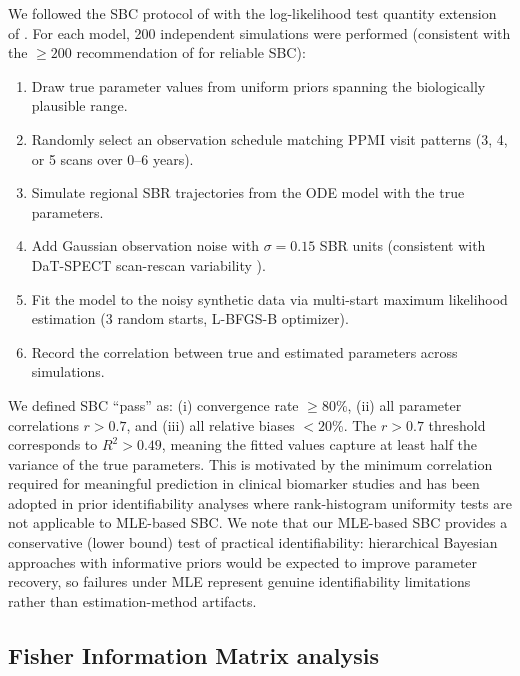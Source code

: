 We followed the SBC protocol of \cite{talts2018} with the log-likelihood test quantity extension of \cite{modrak2022}. For each model, 200 independent simulations were performed (consistent with the $\geq 200$ recommendation of \cite{talts2018} for reliable SBC):

\begin{enumerate}
\item Draw true parameter values from uniform priors spanning the biologically plausible range.
\item Randomly select an observation schedule matching PPMI visit patterns (3, 4, or 5 scans over 0--6 years).
\item Simulate regional SBR trajectories from the ODE model with the true parameters.
\item Add Gaussian observation noise with $\sigma = 0.15$ SBR units (consistent with DaT-SPECT scan-rescan variability \cite{tossicibolt2017}).
\item Fit the model to the noisy synthetic data via multi-start maximum likelihood estimation (3 random starts, L-BFGS-B optimizer).
\item Record the correlation between true and estimated parameters across simulations.
\end{enumerate}

We defined SBC ``pass'' as: (i) convergence rate $\geq 80$\%, (ii) all parameter correlations $r > 0.7$, and (iii) all relative biases $< 20$\%. The $r > 0.7$ threshold corresponds to $R^2 > 0.49$, meaning the fitted values capture at least half the variance of the true parameters. This is motivated by the minimum correlation required for meaningful prediction in clinical biomarker studies \cite{conte2024} and has been adopted in prior identifiability analyses where rank-histogram uniformity tests are not applicable to MLE-based SBC. We note that our MLE-based SBC provides a conservative (lower bound) test of practical identifiability: hierarchical Bayesian approaches with informative priors would be expected to improve parameter recovery, so failures under MLE represent genuine identifiability limitations rather than estimation-method artifacts.

\subsection{Fisher Information Matrix analysis}

